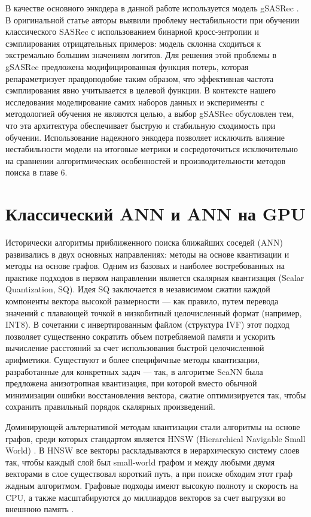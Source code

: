 \documentclass[14pt,a4paper]{extreport}
\numberwithin{figure}{chapter}
\numberwithin{table}{chapter}
\numberwithin{equation}{chapter}
\begin{document}
В качестве основного энкодера в данной работе используется модель gSASRec \cite{petrov2023gsasrec}. В оригинальной статье авторы выявили проблему нестабильности при обучении классического SASRec с использованием бинарной кросс-энтропии и сэмплирования отрицательных примеров: модель склонна сходиться к экстремально большим значениям логитов. Для решения этой проблемы в gSASRec предложена модифицированная функция потерь, которая репараметризует правдоподобие таким образом, что эффективная частота сэмплирования явно учитывается в целевой функции. В контексте нашего исследования моделирование самих наборов данных и эксперименты с методологией обучения не являются целью, а выбор gSASRec обусловлен тем, что эта архитектура обеспечивает быструю и стабильную сходимость при обучении. Использование надежного энкодера позволяет исключить влияние нестабильности модели на итоговые метрики и сосредоточиться исключительно на сравнении алгоритмических особенностей и производительности методов поиска в главе 6.

\section{Классический ANN и ANN на GPU}

Исторически алгоритмы приближенного поиска ближайших соседей (ANN) развивались в двух основных направлениях: методы на основе квантизации и методы на основе графов. Одним из базовых и наиболее востребованных на практике подходов в первом направлении является скалярная квантизация (Scalar Quantization, SQ). Идея SQ заключается в независимом сжатии каждой компоненты вектора высокой размерности --- как правило, путем перевода значений с плавающей точкой в низкобитный целочисленный формат (например, INT8). В сочетании с инвертированным файлом (структура IVF) этот подход позволяет существенно сократить объем потребляемой памяти и ускорить вычисление расстояний за счет использования быстрой целочисленной арифметики. Существуют и более специфичные методы квантизации, разработанные для конкретных задач --- так, в алгоритме ScaNN \cite{guo2020accelerating} была предложена анизотропная квантизация, при которой вместо обычной минимизации ошибки восстановления вектора, сжатие оптимизируется так, чтобы сохранить правильный порядок скалярных произведений.

Доминирующей альтернативой методам квантизации стали алгоритмы на основе графов, среди которых стандартом является HNSW (Hierarchical Navigable Small World) \cite{malkov2020efficient}. В HNSW все векторы раскладываются в иерархическую систему слоев так, чтобы каждый слой был small-world графом и между любыми двумя векторами в слое существовал короткий путь, а при поиске обходим этот граф жадным алгоритмом. Графовые подходы имеют высокую полноту и скорость на CPU, а также масштабируются до миллиардов векторов за счет выгрузки во внешнюю память \cite{subramanya2019diskann}.
\end{document}
